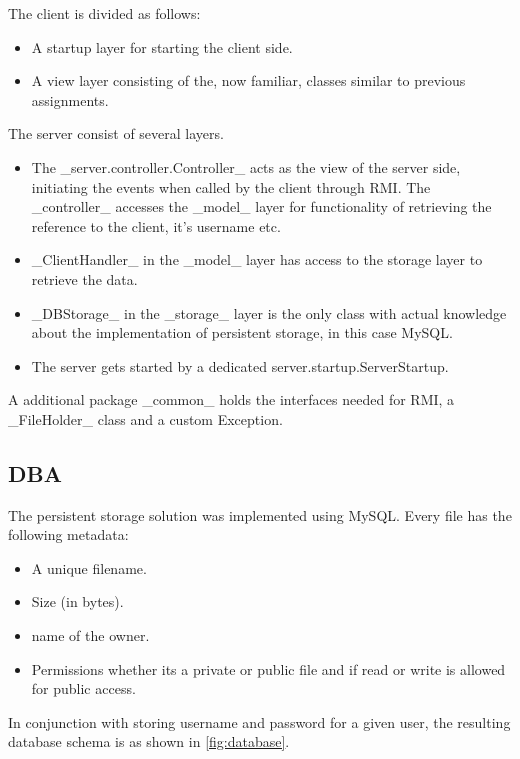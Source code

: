 \documentclass[a4paper]{scrartcl}
\begin{document}
The client is divided as follows:
\begin{itemize}
    \item A startup layer for starting the client side.
    \item A view layer consisting of the, now familiar, classes similar to previous assignments.
\end{itemize}

The server consist of several layers.
\begin{itemize}
    \item The _server.controller.Controller_ acts as the view of the server side, initiating the events when called by the client through RMI.
        The _controller_ accesses the _model_ layer for functionality of retrieving the reference to the client, it's username etc.
    \item _ClientHandler_ in the _model_ layer has access to the storage layer to retrieve the data.
    \item _DBStorage_ in the _storage_ layer is the only class with actual knowledge about the implementation of persistent storage, in this case MySQL.
    \item The server gets started by a dedicated server.startup.ServerStartup.
\end{itemize}

A additional package _common_ holds the interfaces needed for RMI, a _FileHolder_ class and a custom Exception.


\subsection{DBA}
The persistent storage solution was implemented using MySQL.
Every file has the following metadata:
\begin{itemize}
    \item A unique filename.
    \item Size (in bytes).
    \item name of the owner.
    \item Permissions whether its a private or public file and if read or write is allowed for public access.
\end{itemize}

In conjunction with storing username and password for a given user, the resulting database schema is as shown in \ref{fig:database}.
\end{document}
